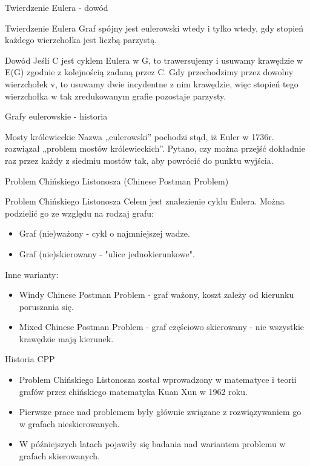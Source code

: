 \documentclass[polish,envcountsect,10pt]{beamer}
\begin{document}
\begin{frame}{Twierdzenie Eulera - dowód}
\begin{block}{Twierdzenie Eulera}
    Graf spójny jest eulerowski wtedy i tylko wtedy, gdy
    stopień każdego wierzchołka jest liczbą parzystą.
\end{block}
\begin{block}{Dowód}
    Jeśli C jest cyklem Eulera w G, to trawersujemy i usuwamy
    krawędzie w E(G) zgodnie z kolejnością zadaną przez C. Gdy przechodzimy
    przez dowolny wierzchołek v, to usuwamy dwie incydentne z nim krawędzie,
    więc stopień tego wierzchołka w tak zredukowanym grafie pozostaje
    parzysty.
\end{block}
\end{frame}

\begin{frame}{Grafy eulerowskie - historia}
    \begin{block}{Mosty królewieckie}
        Nazwa „eulerowski” pochodzi stąd, iż Euler w 1736r. rozwiązał „problem
        mostów królewieckich”. Pytano, czy można przejść dokładnie raz przez
        każdy z siedmiu mostów tak, aby powrócić do punktu wyjścia.
    \end{block}
\end{frame}

\begin{frame}{Problem Chińskiego Listonosza (Chinese Postman Problem)}
    \begin{block}{Problem Chińskiego Listonosza}
        Celem jest znalezienie cyklu Eulera.
        Można podzielić go ze względu na rodzaj grafu:
        \begin{itemize}
            \item Graf (nie)ważony - cykl o najmniejszej wadze.
            \item Graf (nie)skierowany - "ulice jednokierunkowe".
        \end{itemize}
        Inne warianty:
        \begin{itemize}
            \item Windy Chinese Postman Problem - graf ważony, koszt zależy od kierunku poruszania się.
            \item Mixed Chinese Postman Problem - graf częściowo skierowany - nie wszystkie krawędzie mają kierunek.
        \end{itemize}
    \end{block}
\end{frame}

\begin{frame}{Historia CPP}
    \begin{itemize}
        \item Problem Chińskiego Listonosza został wprowadzony w matematyce i teorii grafów przez chińskiego matematyka Kuan Xun w 1962 roku.
        \item Pierwsze prace nad problemem były głównie związane z rozwiązywaniem go w grafach nieskierowanych.
        \item W późniejszych latach pojawiły się badania nad wariantem problemu w grafach skierowanych.
    \end{itemize}
\end{frame}
\end{document}
